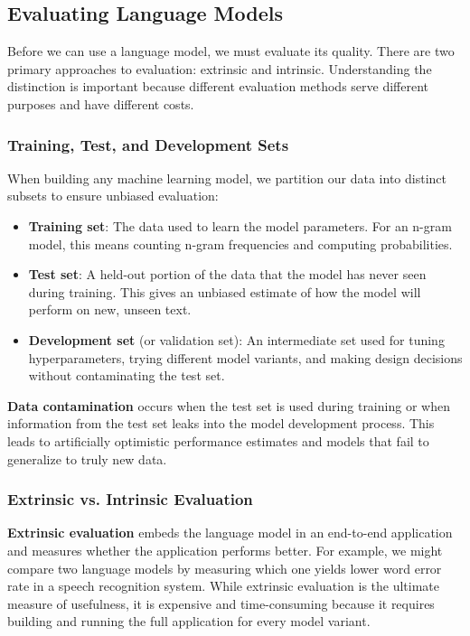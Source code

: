 \documentclass[11pt,a4paper]{article}
\begin{document}
\subsection{Evaluating Language Models}

Before we can use a language model, we must evaluate its quality. There are two primary approaches to evaluation: extrinsic and intrinsic. Understanding the distinction is important because different evaluation methods serve different purposes and have different costs.

\subsubsection{Training, Test, and Development Sets}

When building any machine learning model, we partition our data into distinct subsets to ensure unbiased evaluation:
\begin{itemize}
    \item \textbf{Training set}: The data used to learn the model parameters. For an n-gram model, this means counting n-gram frequencies and computing probabilities.
    \item \textbf{Test set}: A held-out portion of the data that the model has never seen during training. This gives an unbiased estimate of how the model will perform on new, unseen text.
    \item \textbf{Development set} (or validation set): An intermediate set used for tuning hyperparameters, trying different model variants, and making design decisions without contaminating the test set.
\end{itemize}

\textbf{Data contamination} occurs when the test set is used during training or when information from the test set leaks into the model development process. This leads to artificially optimistic performance estimates and models that fail to generalize to truly new data.

\subsubsection{Extrinsic vs. Intrinsic Evaluation}

\textbf{Extrinsic evaluation} embeds the language model in an end-to-end application and measures whether the application performs better. For example, we might compare two language models by measuring which one yields lower word error rate in a speech recognition system. While extrinsic evaluation is the ultimate measure of usefulness, it is expensive and time-consuming because it requires building and running the full application for every model variant.
\end{document}
